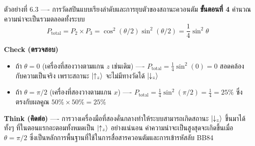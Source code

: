 \begin{psctbox}{ตัวอย่างที่ 6.3 ---- การวัดสปินแบบเรียงลำดับและการยุบตัวของสถานะควอนตัม}
\textbf{ขั้นตอนที่ 4} คำนวณความน่าจะเป็นรวมตลอดทั้งระบบ
\begin{equation*}
P_{\text{total}} = P_2 \times P_3 = \cos^2(\theta/2) \sin^2(\theta/2) = \frac{1}{4} \sin^2\theta
\end{equation*}

\textbf{Check (ตรวจสอบ)}
\begin{itemize}
    \item ถ้า $\theta = 0$ (เครื่องที่สองวางตามแกน $z$ เช่นเดิม) ---- $P_{\text{total}} = \frac{1}{4}\sin^2(0) = 0$ สอดคล้องกับความเป็นจริง เพราะสถานะ $\ket{\uparrow_z}$ จะไม่มีทางวัดได้ $\ket{\downarrow_z}$
    \item ถ้า $\theta = \pi/2$ (เครื่องที่สองวางตามแกน $x$) ---- $P_{\text{total}} = \frac{1}{4}\sin^2(\pi/2) = \frac{1}{4} = 25\%$ ซึ่งตรงกับผลคูณ $50\% \times 50\% = 25\%$
\end{itemize}

\textbf{Think (คิดต่อ)} ---- การวางเครื่องมือที่สองคั่นกลางทำให้ระบบสามารถเกิดสถานะ $\ket{\downarrow_z}$ ขึ้นมาได้ ทั้งๆ ที่ในตอนแรกอะตอมทั้งหมดเป็น $\ket{\uparrow_z}$ อย่างแน่นอน ค่าความน่าจะเป็นสูงสุดจะเกิดขึ้นเมื่อ $\theta = \pi/2$ ซึ่งเป็นหลักการพื้นฐานที่ใช้ในการสื่อสารควอนตัมและการเข้ารหัสลับ BB84
\end{psctbox}

